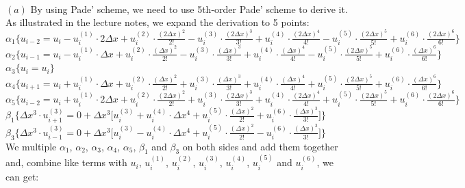 \documentclass[12pt]{article}
\newenvironment{problem}[2][Problem]{\begin{trivlist}
\item[\hskip \labelsep {\bfseries #1}\hskip \labelsep {\bfseries #2.}]}{\end{trivlist}}
\begin{document}
\begin{problem}{3}
\text{ }\\ 
$(a)$ By using Pade' scheme, we need to use 5th-order Pade' scheme to derive it.\\
As illustrated in the lecture notes, we expand the derivation to 5 points:\\

\indent $\alpha_{1} \{ u_{i-2} = u_{i} - u_{i}^{(1)} \cdot  2\Delta x + u_i^{(2)} \cdot \frac{(2\Delta x)^2}{2!}  - u_i^{(3)} \cdot \frac{(2\Delta x)^3}{3!} + u_i^{(4)} \cdot \frac{(2\Delta x)^4}{4!} - u_i^{(5)} \cdot \frac{(2\Delta x)^5}{5!} + u_i^{(6)} \cdot \frac{(2\Delta x)^6}{6!}\}$\\

\indent $\alpha_{2} \{ u_{i-1} = u_{i} - u_{i}^{(1)} \cdot  \Delta x + u_i^{(2)} \cdot \frac{(\Delta x)^2}{2!} -u_i^{(3)} \cdot \frac{(\Delta x)^3}{3!} + u_i^{(4)} \cdot \frac{(\Delta x)^4}{4!} - u_i^{(5)} \cdot \frac{(2\Delta x)^5}{5!} + u_i^{(6)} \cdot \frac{(\Delta x)^6}{6!}\}$\\

\indent $\alpha_{3} \{u_{i} = u_{i} \}$\\

\indent $\alpha_{4} \{ u_{i+1} = u_{i} + u_i^{(1)} \cdot  \Delta x + u_i^{(2)} \cdot \frac{(\Delta x)^2}{2!} + u_i^{(3)} \cdot \frac{(\Delta x)^3}{3!} + u_i^{(4)} \cdot \frac{(\Delta x)^4}{4!} + u_i^{(5)} \cdot \frac{(2\Delta x)^5}{5!} + u_i^{(6)} \cdot \frac{(\Delta x)^6}{6!}\}$\\

\indent $\alpha_{5} \{ u_{i-2} = u_{i} + u_{i}^{(1)} \cdot  2\Delta x + u_i^{(2)} \cdot \frac{(2\Delta x)^2}{2!}  + u_i^{(3)} \cdot \frac{(2\Delta x)^3}{3!} + u_i^{(4)} \cdot \frac{(2\Delta x)^4}{4!} + u_i^{(5)} \cdot \frac{(2\Delta x)^5}{5!} + u_i^{(6)} \cdot \frac{(2\Delta x)^6}{6!}\}$\\

\indent $\beta_{1} \{ \Delta x^3 \cdot u_{i+1}^{(3)} = 0 + \Delta x^3 \lbrack u_{i}^{(3)} + u_{i}^{(4)} \cdot \Delta x^4 + u_i^{(5)} \cdot \frac{(\Delta x)^2}{2!} + u_i^{(6)} \cdot \frac{(\Delta x)^3}{3!} \rbrack \}$\\

\indent $\beta_{3} \{ \Delta x^3 \cdot u_{i-1}^{(3)} = 0 + \Delta x^3 \lbrack u_{i}^{(3)} - u_{i}^{(4)} \cdot \Delta x^4 + u_i^{(5)} \cdot \frac{(\Delta x)^2}{2!} - u_i^{(6)} \cdot \frac{(\Delta x)^3}{3!} \rbrack \}$\\

We multiple $\alpha_{1}$, $\alpha_{2}$, $\alpha_{3}$, $\alpha_{4}$, $\alpha_{5}$, $\beta_{1}$ and $\beta_{3}$ on both sides and add them together and, combine like terms with $u_{i}$, $u_{i}^{(1)}$, $u_{i}^{(2)}$, $u_{i}^{(3)}$, $u_{i}^{(4)}$, $u_{i}^{(5)}$ and $u_{i}^{(6)}$, we can get:\\


\end{problem}
\end{document}
